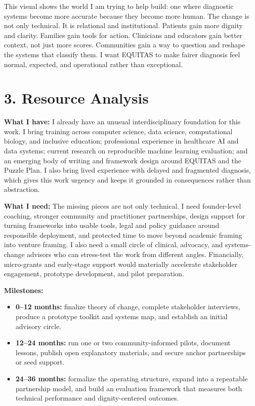 \documentclass[11pt]{article}
\begin{document}
This visual shows the world I am trying to help build: one where diagnostic systems become more accurate because they become more human. The change is not only technical. It is relational and institutional. Patients gain more dignity and clarity. Families gain tools for action. Clinicians and educators gain better context, not just more scores. Communities gain a way to question and reshape the systems that classify them. I want EQUITAS to make fairer diagnosis feel normal, expected, and operational rather than exceptional.

\section*{3. Resource Analysis}

\textbf{What I have:} I already have an unusual interdisciplinary foundation for this work. I bring training across computer science, data science, computational biology, and inclusive education; professional experience in healthcare AI and data systems; current research on reproducible machine learning evaluation; and an emerging body of writing and framework design around EQUITAS and the Puzzle Plan. I also bring lived experience with delayed and fragmented diagnosis, which gives this work urgency and keeps it grounded in consequences rather than abstraction.

\textbf{What I need:} The missing pieces are not only technical. I need founder-level coaching, stronger community and practitioner partnerships, design support for turning frameworks into usable tools, legal and policy guidance around responsible deployment, and protected time to move beyond academic framing into venture framing. I also need a small circle of clinical, advocacy, and systems-change advisors who can stress-test the work from different angles. Financially, micro-grants and early-stage support would materially accelerate stakeholder engagement, prototype development, and pilot preparation.

\textbf{Milestones:}

\begin{itemize}
\item \textbf{0--12 months:} finalize theory of change, complete stakeholder interviews, produce a prototype toolkit and systems map, and establish an initial advisory circle.
\item \textbf{12--24 months:} run one or two community-informed pilots, document lessons, publish open explanatory materials, and secure anchor partnerships or seed support.
\item \textbf{24--36 months:} formalize the operating structure, expand into a repeatable partnership model, and build an evaluation framework that measures both technical performance and dignity-centered outcomes.
\end{itemize}
\end{document}
